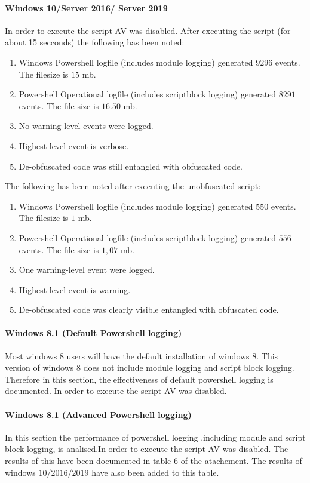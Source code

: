 \documentclass{article}%
\begin{document}
\paragraph{Windows 10/Server 2016/ Server 2019}
In order to execute the script AV was disabled. After executing the script (for about 15 secconds) the following has been noted:
\begin{enumerate}
	\item Windows Powershell logfile (includes module logging) generated $9296$ events. The filesize is $15$ mb.
	\item Powershell Operational logfile (includes scriptblock logging) generated $8291$ events. The file size is $16.50$ mb.
	\item No warning-level events were logged.
	\item Highest level event is verbose.
	\item De-obfuscated code was still entangled with obfuscated code.
\end{enumerate}
The following has been noted after executing the unobfuscated \hyperlink{script2}{script}:
\begin{enumerate}
	\item Windows Powershell logfile (includes module logging) generated $550$ events. The filesize is $1$ mb.
	\item Powershell Operational logfile (includes scriptblock logging) generated $556$ events. The file size is $1,07$ mb.
	\item One warning-level event were logged.
	\item Highest level event is warning.
	\item De-obfuscated code was clearly visible entangled with obfuscated code.
\end{enumerate}

\paragraph{Windows 8.1 (Default Powershell logging)}\hfill\newline
Most windows $8$ users will have the default installation of windows 8. This version of windows $8$ does not include module logging and script block logging. Therefore in this section, the effectiveness of default powershell logging is documented.
In order to execute the script AV was disabled.

\paragraph{Windows 8.1 (Advanced Powershell logging)}\hfill\newline
In this section the performance of powershell logging ,including module and script block logging, is analised.In order to execute the script AV was disabled.
The results of this have been documented in table $6$ of the atachement. The results of windows $10/2016/2019$ have also been added to this table.
\end{document}
